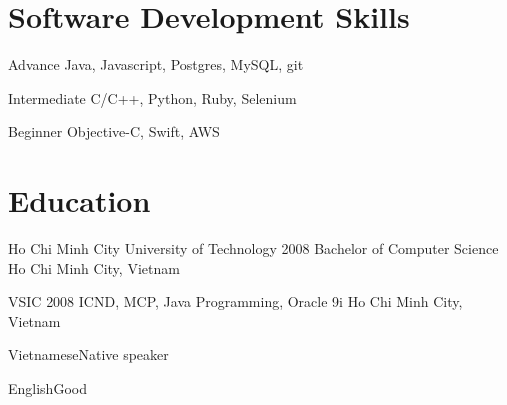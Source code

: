 \documentclass{tccv}
\begin{document}
\section{Software Development Skills}

\begin{factlist}

\item{Advance}
     {Java, Javascript, Postgres, MySQL, git}

\item{Intermediate}
     {C/C++, Python, Ruby, Selenium}

\item{Beginner}
     {Objective-C, Swift, AWS}
\end{factlist}

\section{Education}

\begin{yearlist}

\item[Ho Chi Minh City University of Technology]{2008}
     {Bachelor of Computer Science}
     {Ho Chi Minh City, Vietnam}

\item[VSIC]{2008}
     {ICND, MCP, Java Programming, Oracle 9i}
     {Ho Chi Minh City, Vietnam}

\end{yearlist}

\begin{factlist}
\item{Vietnamese}{Native speaker}
\item{English}{Good}
\end{factlist}
\end{document}
